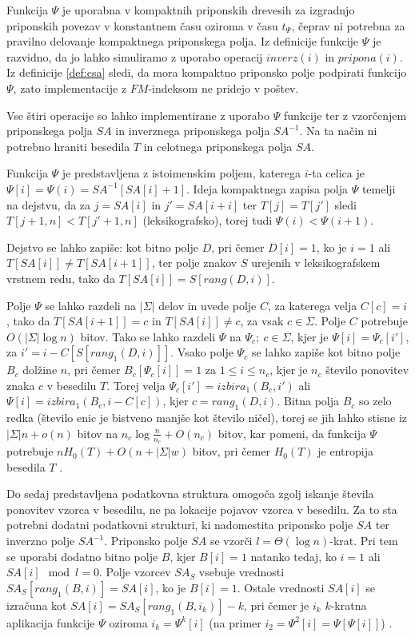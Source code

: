 Funkcija $\Psi$ je uporabna v kompaktnih priponskih drevesih za izgradnjo priponskih povezav v konstantnem času oziroma v času $t_\Psi$, čeprav ni potrebna za pravilno delovanje kompaktnega priponskega polja. Iz definicije funkcije $\Psi$ je razvidno, da jo lahko simuliramo z uporabo operacij $inverz(i)$ in $pripona(i)$. Iz definicije \ref{def:csa} sledi, da mora kompaktno priponsko polje podpirati funkcijo $\Psi$, zato implementacije z $FM$-indeksom ne pridejo v poštev. 

Vse štiri operacije so lahko implementirane z uporabo $\Psi$ funkcije ter z vzorčenjem priponskega polja $SA$ in inverznega priponskega polja $SA^{-1}$. Na ta način ni potrebno hraniti besedila $T$ in celotnega priponskega polja $SA$.

Funkcija $\Psi$ je predstavljena z istoimenskim poljem, katerega $i$-ta celica je $\Psi[i]=\Psi(i)=SA^{-1}[SA[i]+1]$. Ideja kompaktnega zapisa polja $\Psi$ temelji na dejstvu, da za $j=SA[i]$ in $j'=SA[i+i]$ ter $T[j]=T[j']$ sledi $T[j+1,n]<T[j'+1,n]$ (leksikografsko), torej tudi $\Psi(i)<\Psi(i+1)$. 

Dejstvo se lahko zapiše: kot bitno polje $D$, pri čemer $D[i]=1$, ko je $i=1$ ali $T[SA[i]]\ne T[SA[i+1]]$, ter polje znakov $S$ urejenih v leksikografskem vrstnem redu, tako da $T[SA[i]]=S[rang(D,i)]$.

Polje $\Psi$ se lahko razdeli na $|\Sigma|$ delov in uvede polje $C$, za katerega velja $C[c]=i$, tako da $T[SA[i+1]]=c$ in $T[SA[i]]\ne c$, za vsak $c\in\Sigma$. Polje $C$ potrebuje $O(|\Sigma|\log{n})$ bitov. Tako se lahko razdeli $\Psi$ na $\Psi_c;\:c\in\Sigma$, kjer je $\Psi[i]=\Psi_c[i']$,  za $i'=i-C[S[rang_1(D,i)]]$. Vsako polje $\Psi_c$ se lahko zapiše kot bitno polje $B_c$ dolžine $n$, pri čemer $B_c[\Psi_c[i]]=1$ za $1 \le i \le n_c$, kjer je $n_c$ število ponovitev znaka $c$ v besedilu $T$. Torej velja $\Psi_c[i']=izbira_1(B_c,i')$ ali $\Psi[i]=izbira_1(B_c,i-C[c])$, kjer $c=rang_1(D,i)$. Bitna polja $B_c$ so zelo redka (število enic je bistveno manjše kot število ničel), torej se jih lahko stisne iz $|\Sigma|n+o(n)$ bitov na $n_c\log\frac{n}{n_c}+O(n_c)$ bitov, kar pomeni, da funkcija $\Psi$ potrebuje $nH_0(T)+O(n+|\Sigma|w)$ bitov, pri čemer $H_0(T)$ je entropija besedila $T$ \cite{Navarro2016}.

Do sedaj predstavljena podatkovna struktura omogoča zgolj iskanje števila ponovitev vzorca v besedilu, ne pa lokacije pojavov vzorca v besedilu. Za to sta potrebni dodatni podatkovni strukturi, ki nadomestita priponsko polje $SA$ ter inverzno polje $SA^{-1}$. Priponsko polje $SA$ se vzorči $l=\Theta(\log{n})$-krat. Pri tem se uporabi dodatno bitno polje $B$, kjer $B[i]=1$ natanko tedaj, ko $i=1$ ali $SA[i]\mod{l} =0$. Polje vzorcev $SA_S$ vsebuje vrednosti $SA_S[rang_1(B,i)]=SA[i]$, ko je $B[i]=1$. Ostale vrednosti $SA[i]$ se izračuna kot $SA[i]=SA_S[rang_1(B,i_k)]-k$, pri čemer je $i_k$ $k$-kratna aplikacija funkcije $\Psi$ oziroma $i_k=\Psi^k[i]$ (na primer $i_2=\Psi^2[i]=\Psi[\Psi[i]]$) \cite{Navarro2016}.

